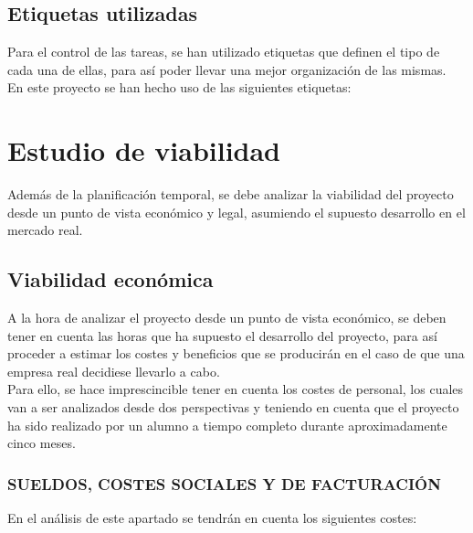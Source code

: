 \subsection{Etiquetas utilizadas}
Para el control de las tareas, se han utilizado etiquetas que definen el tipo de cada una de ellas, para así poder llevar una mejor organización de las mismas.\\
En este proyecto se han hecho uso de las siguientes etiquetas:

\section{Estudio de viabilidad}
Además de la planificación temporal, se debe analizar la viabilidad del proyecto desde un punto de vista económico y legal, asumiendo el supuesto desarrollo en el mercado real. 

\subsection{Viabilidad económica}
 A la hora de analizar el proyecto desde un punto de vista económico, se deben tener en cuenta las horas que ha supuesto el desarrollo del proyecto, para así proceder a estimar los costes y beneficios que se producirán en el caso de que una empresa real decidiese llevarlo a cabo.\\
 Para ello, se hace imprescincible tener en cuenta los costes de personal, los cuales van a ser analizados desde dos perspectivas y teniendo en cuenta que el proyecto ha sido realizado por un alumno a tiempo completo durante aproximadamente cinco meses.

\subsubsection{SUELDOS, COSTES SOCIALES Y DE FACTURACIÓN}

En el análisis de este apartado se tendrán en cuenta los siguientes costes:

